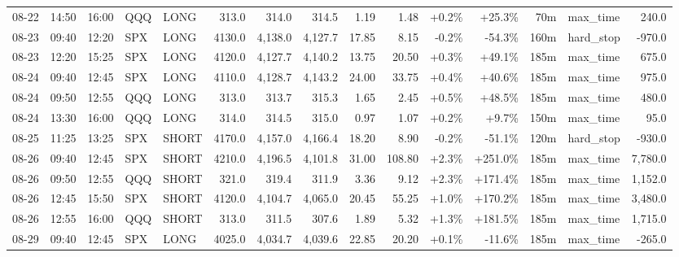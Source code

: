 \documentclass[11pt,a4paper,twoside]{article}
\begin{document}
\begin{landscape}
\begin{center}
\begin{longtable}{>{\color{txtmain}}l l l l l r r r r r r r r >{\color{txtmain}}l r}
08-22 & 14:50 & 16:00 & QQQ & LONG & 313.0 & 314.0 & 314.5 & 1.19 & 1.48 & \textcolor{wingreen}{+0.2\%} & \textcolor{wingreen}{+25.3\%} & 70m & max\_time & \textcolor{wingreen}{240.0} \\
08-23 & 09:40 & 12:20 & SPX & LONG & 4130.0 & 4,138.0 & 4,127.7 & 17.85 & 8.15 & \textcolor{lossred}{-0.2\%} & \textcolor{lossred}{-54.3\%} & 160m & hard\_stop & \textcolor{lossred}{-970.0} \\
08-23 & 12:20 & 15:25 & SPX & LONG & 4120.0 & 4,127.7 & 4,140.2 & 13.75 & 20.50 & \textcolor{wingreen}{+0.3\%} & \textcolor{wingreen}{+49.1\%} & 185m & max\_time & \textcolor{wingreen}{675.0} \\
08-24 & 09:40 & 12:45 & SPX & LONG & 4110.0 & 4,128.7 & 4,143.2 & 24.00 & 33.75 & \textcolor{wingreen}{+0.4\%} & \textcolor{wingreen}{+40.6\%} & 185m & max\_time & \textcolor{wingreen}{975.0} \\
08-24 & 09:50 & 12:55 & QQQ & LONG & 313.0 & 313.7 & 315.3 & 1.65 & 2.45 & \textcolor{wingreen}{+0.5\%} & \textcolor{wingreen}{+48.5\%} & 185m & max\_time & \textcolor{wingreen}{480.0} \\
08-24 & 13:30 & 16:00 & QQQ & LONG & 314.0 & 314.5 & 315.0 & 0.97 & 1.07 & \textcolor{wingreen}{+0.2\%} & \textcolor{wingreen}{+9.7\%} & 150m & max\_time & \textcolor{wingreen}{95.0} \\
08-25 & 11:25 & 13:25 & SPX & SHORT & 4170.0 & 4,157.0 & 4,166.4 & 18.20 & 8.90 & \textcolor{lossred}{-0.2\%} & \textcolor{lossred}{-51.1\%} & 120m & hard\_stop & \textcolor{lossred}{-930.0} \\
08-26 & 09:40 & 12:45 & SPX & SHORT & 4210.0 & 4,196.5 & 4,101.8 & 31.00 & 108.80 & \textcolor{wingreen}{+2.3\%} & \textcolor{wingreen}{+251.0\%} & 185m & max\_time & \textcolor{wingreen}{7,780.0} \\
08-26 & 09:50 & 12:55 & QQQ & SHORT & 321.0 & 319.4 & 311.9 & 3.36 & 9.12 & \textcolor{wingreen}{+2.3\%} & \textcolor{wingreen}{+171.4\%} & 185m & max\_time & \textcolor{wingreen}{1,152.0} \\
08-26 & 12:45 & 15:50 & SPX & SHORT & 4120.0 & 4,104.7 & 4,065.0 & 20.45 & 55.25 & \textcolor{wingreen}{+1.0\%} & \textcolor{wingreen}{+170.2\%} & 185m & max\_time & \textcolor{wingreen}{3,480.0} \\
08-26 & 12:55 & 16:00 & QQQ & SHORT & 313.0 & 311.5 & 307.6 & 1.89 & 5.32 & \textcolor{wingreen}{+1.3\%} & \textcolor{wingreen}{+181.5\%} & 185m & max\_time & \textcolor{wingreen}{1,715.0} \\
08-29 & 09:40 & 12:45 & SPX & LONG & 4025.0 & 4,034.7 & 4,039.6 & 22.85 & 20.20 & \textcolor{wingreen}{+0.1\%} & \textcolor{lossred}{-11.6\%} & 185m & max\_time & \textcolor{lossred}{-265.0} \\

\end{longtable}
\end{center}
\end{landscape}
\end{document}
